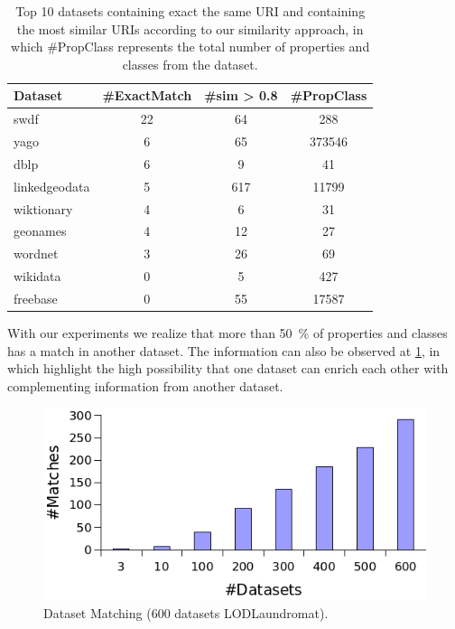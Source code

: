 \documentclass[sw]{iosart2x}
\begin{document}
\begin{table}[htb]
\centering
\begin{tabular}{lS[table-format=9.0]S[table-format=8.0]S[table-format=10.0]}
\toprule
\textbf{Dataset} & \textbf{\#ExactMatch} & \textbf{\#sim > 0.8} & \textbf{\#PropClass} \\
\midrule
swdf & 22 & 64 & 288 \\
yago & 6 & 65 & 373546 \\
dblp & 6 & 9 & 41 \\
linkedgeodata & 5 & 617 & 11799 \\
wiktionary & 4 & 6 & 31 \\
geonames & 4 & 12 & 27 \\
wordnet & 3 & 26 & 69 \\
wikidata & 0 & 5 & 427 \\
freebase & 0 & 55 & 17587 \\
\bottomrule
\end{tabular}
\caption{Top 10 datasets containing exact the same URI and containing the most similar URIs according to our similarity approach, in which \#PropClass represents the total number of properties and classes from the dataset. }
\label{tab:top10}
\end{table}



With our experiments we realize that more than \SI{50}{\percent} of properties and classes has a match in another dataset. The information can also be observed at \cref{fig:match600Laundromat}, in which highlight the high possibility that one dataset can enrich each other with complementing information from another dataset.


\begin{figure}[htb] 
	\centering
	\includegraphics[width=\linewidth]{img/LaundromatDsMatch.png}
	\caption{Dataset Matching (600 datasets LODLaundromat).}
	\label{fig:match600Laundromat}
\end{figure}
\end{document}
